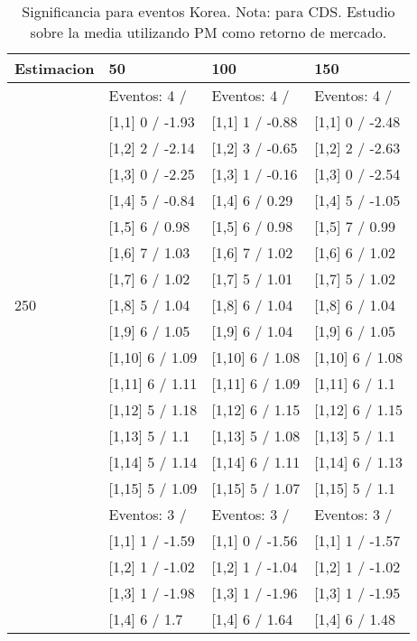 \begin{table}

\caption{Significancia para eventos Korea. Nota: para CDS. Estudio sobre la media utilizando PM como retorno de mercado.}
\centering
\begin{tabular}[t]{llll}
\toprule
Estimacion & 50 & 100 & 150\\
\midrule
 & Eventos:  4 / & Eventos:  4 / & Eventos:  4 /\\
 & {}[1,1] 0  / -1.93 & {}[1,1] 1  / -0.88 & {}[1,1] 0  / -2.48\\
 & {}[1,2] 2  / -2.14 & {}[1,2] 3  / -0.65 & {}[1,2] 2  / -2.63\\
 & {}[1,3] 0  / -2.25 & {}[1,3] 1  / -0.16 & {}[1,3] 0  / -2.54\\
 & {}[1,4] 5  / -0.84 & {}[1,4] 6  / 0.29 & {}[1,4] 5  / -1.05\\
\addlinespace
 & {}[1,5] 6  / 0.98 & {}[1,5] 6  / 0.98 & {}[1,5] 7  / 0.99\\
 & {}[1,6] 7  / 1.03 & {}[1,6] 7  / 1.02 & {}[1,6] 6  / 1.02\\
 & {}[1,7] 6  / 1.02 & {}[1,7] 5  / 1.01 & {}[1,7] 5  / 1.02\\
250 & {}[1,8] 5  / 1.04 & {}[1,8] 6  / 1.04 & {}[1,8] 6  / 1.04\\
 & {}[1,9] 6  / 1.05 & {}[1,9] 6  / 1.04 & {}[1,9] 6  / 1.05\\
\addlinespace
 & {}[1,10] 6  / 1.09 & {}[1,10] 6  / 1.08 & {}[1,10] 6  / 1.08\\
 & {}[1,11] 6  / 1.11 & {}[1,11] 6  / 1.09 & {}[1,11] 6  / 1.1\\
 & {}[1,12] 5  / 1.18 & {}[1,12] 6  / 1.15 & {}[1,12] 6  / 1.15\\
 & {}[1,13] 5  / 1.1 & {}[1,13] 5  / 1.08 & {}[1,13] 5  / 1.1\\
 & {}[1,14] 5  / 1.14 & {}[1,14] 6  / 1.11 & {}[1,14] 6  / 1.13\\
\addlinespace
 & {}[1,15] 5  / 1.09 & {}[1,15] 5  / 1.07 & {}[1,15] 5  / 1.1\\
 & Eventos:  3 / & Eventos:  3 / & Eventos:  3 /\\
 & {}[1,1] 1  / -1.59 & {}[1,1] 0  / -1.56 & {}[1,1] 1  / -1.57\\
 & {}[1,2] 1  / -1.02 & {}[1,2] 1  / -1.04 & {}[1,2] 1  / -1.02\\
 & {}[1,3] 1  / -1.98 & {}[1,3] 1  / -1.96 & {}[1,3] 1  / -1.95\\
\addlinespace
 & {}[1,4] 6  / 1.7 & {}[1,4] 6  / 1.64 & {}[1,4] 6  / 1.48\\

\end{tabular}
\end{table}

